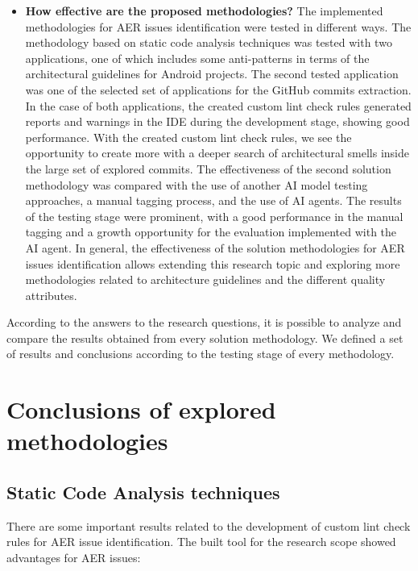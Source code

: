 \begin{itemize}
	\item \textbf{How effective are the proposed methodologies?} The implemented methodologies for AER issues identification were tested in different ways. The methodology based on static code analysis techniques was tested with two applications, one of which includes some anti-patterns in terms of the architectural guidelines for Android projects. The second tested application was one of the selected set of applications for the GitHub commits extraction. In the case of both applications, the created custom lint check rules generated reports and warnings in the IDE during the development stage, showing good performance. With the created custom lint check rules, we see the opportunity to create more with a deeper search of architectural smells inside the large set of explored commits. The effectiveness of the second solution methodology was compared with the use of another AI model testing approaches, a manual tagging process, and the use of AI agents. The results of the testing stage were prominent, with a good performance in the manual tagging and a growth opportunity for the evaluation implemented with the AI agent. In general, the effectiveness of the solution methodologies for AER issues identification allows extending this research topic and exploring more methodologies related to architecture guidelines and the different quality attributes.

\end{itemize}

According to the answers to the research questions, it is possible to analyze and compare the results obtained from every solution methodology. We defined a set of results and conclusions according to the testing stage of every methodology. 


\section{Conclusions of explored methodologies}

\subsection{Static Code Analysis techniques}
There are some important results related to the development of custom lint check rules for AER issue identification. The built tool for the research scope showed advantages for AER issues:

